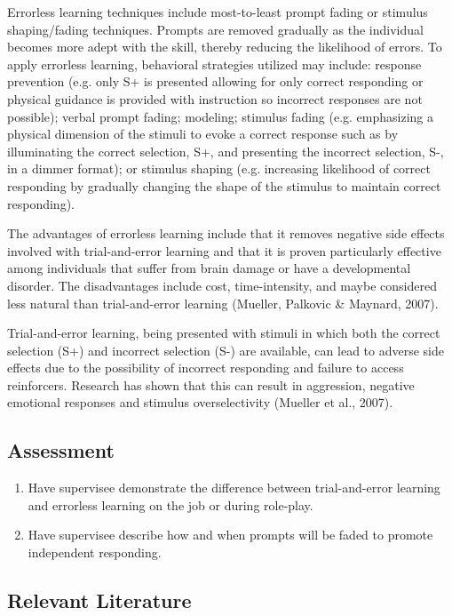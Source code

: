 Errorless learning techniques include most-to-least prompt fading or stimulus shaping/fading techniques. Prompts are removed gradually as the individual becomes more adept with the skill, thereby reducing the likelihood of errors.  To apply errorless learning, behavioral strategies utilized may include: response prevention (e.g. only S+ is presented allowing for only correct responding or physical guidance is provided with instruction so incorrect responses are not possible); verbal prompt fading; modeling; stimulus fading (e.g. emphasizing a physical dimension of the stimuli to evoke a correct response such as by illuminating the correct selection, S+, and presenting the incorrect selection, S-, in a dimmer format); or stimulus shaping (e.g. increasing likelihood of correct responding by gradually changing the shape of the stimulus to maintain correct responding). 

The advantages of errorless learning include that it removes negative side effects involved with trial-and-error learning and that it is proven particularly effective among individuals that suffer from brain damage or have a developmental disorder. The disadvantages include cost, time-intensity, and maybe considered less natural than trial-and-error learning (Mueller, Palkovic \& Maynard, 2007).

Trial-and-error learning, being presented with stimuli in which both the correct selection (S+) and incorrect selection (S-) are available, can lead to adverse side effects due to the possibility of incorrect responding and failure to access reinforcers. Research has shown that this can result in aggression, negative emotional responses and stimulus overselectivity (Mueller et al., 2007).
%
\subsection{Assessment}
\begin{enumerate}
\item Have supervisee demonstrate the difference between trial-and-error learning and errorless learning on the job or during role-play.
\item Have supervisee describe how and when prompts will be faded to promote independent responding. 
%
\end{enumerate}
%
\subsection{Relevant Literature}
\begin{refsection}
\nocite{fillingham2003application,
        mueller2007errorless,
        terrace1963errorless}
\printbibliography[heading=none]
\end{refsection}
%
